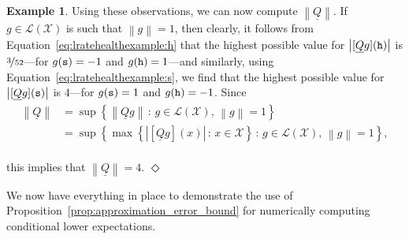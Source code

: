 \documentclass[10pt,a4paper]{paper}
\theoremstyle{definition}
\newtheorem{exmp}{Example}
\newcommand{\states}{\mathcal{X}}
\newcommand{\gambles}{\mathcal{L}}
\newcommand{\gamblesX}{\gambles(\states)}
\newcommand{\lrate}{\underline{Q}}
\newcommand{\norm}[1]{\left\lVert #1 \right\rVert}
\newcommand{\abs}[1]{\left\vert #1 \right\vert}
\newcommand{\exampleend}{\hfill$\Diamond$}
\begin{document}
\begin{exmp}
Using these observations, we can now compute $\norm{\lrate}$. If $g\in\gamblesX$ is such that $\norm{g}=1$, then clearly, it follows from Equation~\eqref{eq:lratehealthexample:h} that the highest possible value for $\abs{[\lrate g]({\tt h})}$ is $\nicefrac{3}{52}$---for $g({\tt s})=-1$ and $g({\tt h})=1$---and similarly, using Equation~\eqref{eq:lratehealthexample:s}, we find that the highest possible value for $\abs{[\lrate g]({\tt s})}$ is $4$---for $g({\tt s})=1$ and $g({\tt h})=-1$. Since
\vspace{-2pt}
\begin{align*}
\norm{\lrate} &= \sup\left\{ \norm{\lrate g}\,:\,g\in\gamblesX,\, \norm{g}=1 \right\} \\
 &= \sup\left\{ \max\left\{\abs{\left[\lrate g\right](x)}\,:\,x\in\states\right\}\,:\,g\in\gamblesX,\, \norm{g}=1 \right\},
\end{align*}\\[-4pt]
this implies that $\norm{\lrate}=4$.
\exampleend
\end{exmp}

We now have everything in place to demonstrate the use of Proposition~\ref{prop:approximation_error_bound} for numerically computing conditional lower expectations. 
\end{document}
